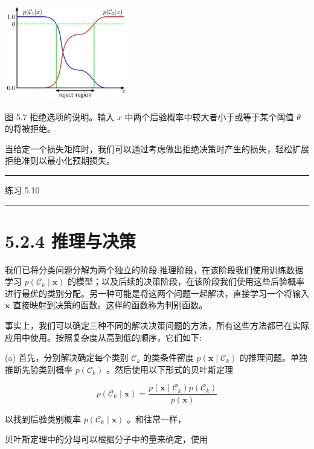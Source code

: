 \documentclass[10pt]{article}
\newcommand{\HRule}{\begin{center}\rule{0.9\linewidth}{0.2mm}\end{center}}
\begin{document}
\begin{center}
\includegraphics[max width=0.4\textwidth]{images/0194e279-9b28-703a-88f4-c3ac21e2010d_162_957_344_588_458_0.jpg}
\end{center}
\hspace*{3em} 

图 5.7 拒绝选项的说明。输入 \(x\) 中两个后验概率中较大者小于或等于某个阈值 \(\theta\) 的将被拒绝。

当给定一个损失矩阵时，我们可以通过考虑做出拒绝决策时产生的损失，轻松扩展拒绝准则以最小化预期损失。

\HRule

练习 5.10

\HRule

\section*{5.2.4 推理与决策}

我们已将分类问题分解为两个独立的阶段:推理阶段，在该阶段我们使用训练数据学习 \(p\left( {{\mathcal{C}}_{k} \mid  \mathbf{x}}\right)\) 的模型；以及后续的决策阶段，在该阶段我们使用这些后验概率进行最优的类别分配。另一种可能是将这两个问题一起解决，直接学习一个将输入 \(\mathbf{x}\) 直接映射到决策的函数。这样的函数称为判别函数。

事实上，我们可以确定三种不同的解决决策问题的方法，所有这些方法都已在实际应用中使用。按照复杂度从高到低的顺序，它们如下:

(a) 首先，分别解决确定每个类别 \({\mathcal{C}}_{k}\) 的类条件密度 \(p\left( {\mathbf{x} \mid  {\mathcal{C}}_{k}}\right)\) 的推理问题。单独推断先验类别概率 \(p\left( {\mathcal{C}}_{k}\right)\) 。然后使用以下形式的贝叶斯定理

\[
p\left( {{\mathcal{C}}_{k} \mid  \mathbf{x}}\right)  = \frac{p\left( {\mathbf{x} \mid  {\mathcal{C}}_{k}}\right) p\left( {\mathcal{C}}_{k}\right) }{p\left( \mathbf{x}\right) } \tag{5.24}
\]

以找到后验类别概率 \(p\left( {{\mathcal{C}}_{k} \mid  \mathbf{x}}\right)\) 。和往常一样，

贝叶斯定理中的分母可以根据分子中的量来确定，使用
\end{document}
